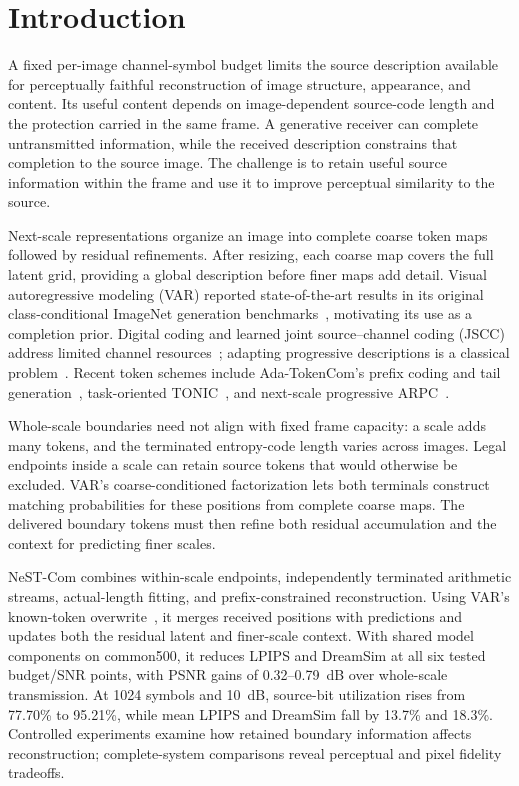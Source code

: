 \section{Introduction}
A fixed per-image channel-symbol budget limits the source description available for perceptually faithful reconstruction of image structure, appearance, and content. Its useful content depends on image-dependent source-code length and the protection carried in the same frame. A generative receiver can complete untransmitted information, while the received description constrains that completion to the source image. The challenge is to retain useful source information within the frame and use it to improve perceptual similarity to the source.

Next-scale representations organize an image into complete coarse token maps followed by residual refinements. After resizing, each coarse map covers the full latent grid, providing a global description before finer maps add detail. Visual autoregressive modeling (VAR) reported state-of-the-art results in its original class-conditional ImageNet generation benchmarks~\cite{var}, motivating its use as a completion prior. Digital coding and learned joint source--channel coding (JSCC) address limited channel resources~\cite{deepjscc,swinjscc}; adapting progressive descriptions is a classical problem~\cite{chande}. Recent token schemes include Ada-TokenCom's prefix coding and tail generation~\cite{adatokencom}, task-oriented TONIC~\cite{tonic}, and next-scale progressive ARPC~\cite{arpc}.

Whole-scale boundaries need not align with fixed frame capacity: a scale adds many tokens, and the terminated entropy-code length varies across images. Legal endpoints inside a scale can retain source tokens that would otherwise be excluded. VAR's coarse-conditioned factorization lets both terminals construct matching probabilities for these positions from complete coarse maps. The delivered boundary tokens must then refine both residual accumulation and the context for predicting finer scales.

NeST-Com combines within-scale endpoints, independently terminated arithmetic streams, actual-length fitting, and prefix-constrained reconstruction. Using VAR's known-token overwrite~\cite{var}, it merges received positions with predictions and updates both the residual latent and finer-scale context. With shared model components on common500, it reduces LPIPS and DreamSim at all six tested budget/SNR points, with PSNR gains of 0.32--0.79~dB over whole-scale transmission. At 1024 symbols and 10~dB, source-bit utilization rises from 77.70\% to 95.21\%, while mean LPIPS and DreamSim fall by 13.7\% and 18.3\%. Controlled experiments examine how retained boundary information affects reconstruction; complete-system comparisons reveal perceptual and pixel fidelity tradeoffs.
